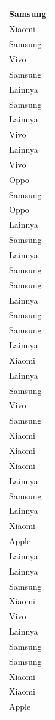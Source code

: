 \documentclass[
  letterpaper,
  DIV=11,
  numbers=noendperiod]{scrartcl}
\begin{document}
\begin{table}
\begin{tabular}[t]{l}
\hline
Samsung\\
\hline
Xiaomi\\
\hline
Samsung\\
\hline
Vivo\\
\hline
Samsung\\
\hline
Lainnya\\
\hline
Samsung\\
\hline
Lainnya\\
\hline
Vivo\\
\hline
Lainnya\\
\hline
Vivo\\
\hline
Oppo\\
\hline
Samsung\\
\hline
Oppo\\
\hline
Lainnya\\
\hline
Samsung\\
\hline
Lainnya\\
\hline
Samsung\\
\hline
Samsung\\
\hline
Lainnya\\
\hline
Samsung\\
\hline
Samsung\\
\hline
Lainnya\\
\hline
Xiaomi\\
\hline
Lainnya\\
\hline
Samsung\\
\hline
Vivo\\
\hline
Samsung\\
\hline
Xiaomi\\
\hline
Xiaomi\\
\hline
Xiaomi\\
\hline
Lainnya\\
\hline
Samsung\\
\hline
Lainnya\\
\hline
Xiaomi\\
\hline
Apple\\
\hline
Lainnya\\
\hline
Lainnya\\
\hline
Samsung\\
\hline
Xiaomi\\
\hline
Vivo\\
\hline
Lainnya\\
\hline
Samsung\\
\hline
Samsung\\
\hline
Xiaomi\\
\hline
Xiaomi\\
\hline
Apple\\

\end{tabular}
\end{table}
\end{document}
